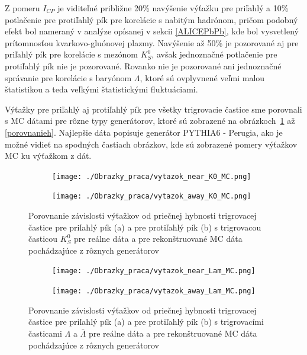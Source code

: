\documentclass[thesismargins, thesislinespacing]{rnthesis}
\begin{document}
Z pomeru $I_{CP}$ je viditeľné približne 20\% navýšenie výťažku pre priľahlý a 10\% potlačenie pre protiľahlý pík pre korelácie s nabitým hadrónom, pričom podobný efekt bol nameraný v analýze opísanej v sekcii \ref{ALICEPbPb}, kde bol vysvetlený prítomnosťou kvarkovo-gluónovej plazmy. 
Navýšenie až 50\% je pozorované aj pre priľahlý pík pre korelácie s mezónom $K_{S}^{0}$, avšak jednoznačné potlačenie pre protiľahlý pík nie je pozorované. Rovanko nie je pozorované ani jednoznačné správanie pre korelácie s baryónom $\Lambda$, ktoré sú ovplyvnené veľmi malou štatistikou a teda veľkými štatistickými fluktuáciami. 

Výťažky pre priľahlý aj protiľahlý pík pre všetky trigrovacie častice sme porovnali s MC dátami pre rôzne typy generátorov, ktoré sú zobrazené na obrázkoch~\ref{porovnanie} až \ref{porovnanieh}. Najlepšie dáta popisuje generátor PYTHIA6 - Perugia, ako je možné vidieť na spodných častiach obrázkov, kde sú zobrazené pomery výťažkov MC ku výťažkom z dát.

\begin{figure}[hbtp!]
	\centering
	\begin{subfigure}{0.5\textwidth}
		\centering
		\texttt{[image: ./Obrazky\_praca/vytazok\_near\_K0\_MC.png]}
		\caption{}
	\end{subfigure}%
	\begin{subfigure}{0.5\textwidth}
		\centering
		\texttt{[image: ./Obrazky\_praca/vytazok\_away\_K0\_MC.png]}
		\caption{}
	\end{subfigure}
	\caption{Porovnanie závislosti výťažkov od priečnej hybnosti trigrovacej častice pre priľahlý pík (a) a pre protiľahlý pík (b) s trigrovacou časticou $K^0_S$ pre reálne dáta a pre rekonštruované MC dáta pochádzajúce z rôznych generátorov}
	\label{porovnanie}
\end{figure}

\begin{figure}[hbtp!]
	\centering
\begin{subfigure}{0.5\textwidth}
	\centering
	\texttt{[image: ./Obrazky\_praca/vytazok\_near\_Lam\_MC.png]}
	\caption{}
\end{subfigure}%
\begin{subfigure}{0.5\textwidth}
	\centering
	\texttt{[image: ./Obrazky\_praca/vytazok\_away\_Lam\_MC.png]}
	\caption{}
\end{subfigure}
	\caption{Porovnanie závislosti výťažkov od priečnej hybnosti trigrovacej častice pre priľahlý pík (a) a pre protiľahlý pík (b) s trigrovacími časticami $\Lambda$ a $\bar{\Lambda}$ pre reálne dáta a pre rekonštruované MC dáta pochádzajúce z rôznych generátorov}
	\label{porovnanieL}
\end{figure}
\end{document}
